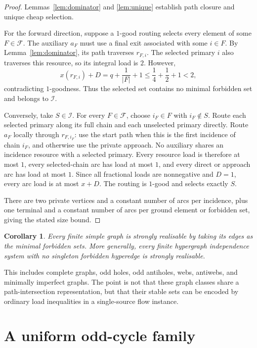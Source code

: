 \documentclass[11pt]{article}
\newtheorem{corollary}[theorem]{Corollary}
\theoremstyle{definition}
\newcommand{\calI}{\mathcal{I}}
\newcommand{\calF}{\mathcal{F}}
\begin{document}
\begin{proof}
Lemmas~\ref{lem:dominator} and \ref{lem:unique} establish path closure and unique cheap selection.

For the forward direction, suppose a \(1\)-good routing selects every element of some \(F\in\calF\). The auxiliary \(a_F\) must use a final exit associated with some \(i\in F\). By Lemma~\ref{lem:dominator}, its path traverses \(r_{F,i}\). The selected primary \(i\) also traverses this resource, so its integral load is \(2\). However,
\[
x(r_{F,i})+D
=q+\frac1{|F|}+1
\le\frac14+\frac12+1
<2,
\]
contradicting \(1\)-goodness. Thus the selected set contains no minimal forbidden set and belongs to \(\calI\).

Conversely, take \(S\in\calI\). For every \(F\in\calF\), choose \(i_F\in F\) with \(i_F\notin S\). Route each selected primary along its full chain and each unselected primary directly. Route \(a_F\) locally through \(r_{F,i_F}\): use the start path when this is the first incidence of chain \(i_F\), and otherwise use the private approach. No auxiliary shares an incidence resource with a selected primary. Every resource load is therefore at most \(1\), every selected-chain arc has load at most \(1\), and every direct or approach arc has load at most \(1\). Since all fractional loads are nonnegative and \(D=1\), every arc load is at most \(x+D\). The routing is \(1\)-good and selects exactly \(S\).

There are two private vertices and a constant number of arcs per incidence, plus one terminal and a constant number of arcs per ground element or forbidden set, giving the stated size bound.
\end{proof}

\begin{corollary}\label{cor:graphs}
Every finite simple graph is strongly realisable by taking its edges as the minimal forbidden sets. More generally, every finite hypergraph independence system with no singleton forbidden hyperedge is strongly realisable.
\end{corollary}

This includes complete graphs, odd holes, odd antiholes, webs, antiwebs, and minimally imperfect graphs. The point is not that these graph classes share a path-intersection representation, but that their stable sets can be encoded by ordinary load inequalities in a single-source flow instance.

\section{A uniform odd-cycle family}\label{sec:cycle}
\end{document}
